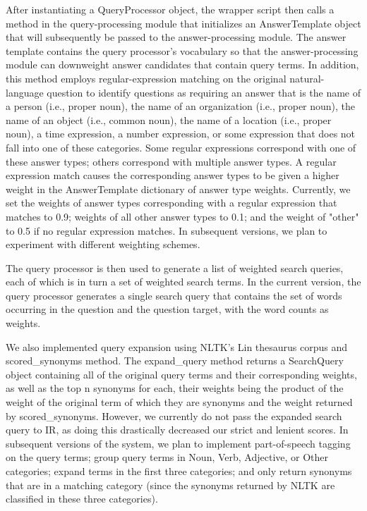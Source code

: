 \documentclass[11pt]{article}
\begin{document}
After instantiating a QueryProcessor object, the wrapper script then calls a method in the query-processing module that initializes an AnswerTemplate object that will subsequently be passed to the answer-processing module. The answer template contains the query processor's vocabulary so that the answer-processing module can downweight answer candidates that contain query terms. In addition, this method employs regular-expression matching on the original natural-language question to identify questions as requiring an answer that is the name of a person (i.e., proper noun), the name of an organization (i.e., proper noun), the name of an object (i.e., common noun), the name of a location (i.e., proper noun), a time expression, a number expression, or some expression that does not fall into one of these categories. Some regular expressions correspond with one of these answer types; others correspond with multiple answer types. A regular expression match causes the corresponding answer types to be given a higher weight in the AnswerTemplate dictionary of answer type weights. Currently, we set the weights of answer types corresponding with a regular expression that matches to 0.9; weights of all other answer types to 0.1; and the weight of "other" to 0.5 if no regular expression matches. In subsequent versions, we plan to experiment with different weighting schemes.

The query processor is then used to generate a list of weighted search queries, each of which is in turn a set of weighted search terms. In the current version, the query processor generates a single search query that contains the set of words occurring in the question and the question target, with the word counts as weights.

We also implemented query expansion using NLTK's Lin thesaurus corpus and scored\_synonyms method. The expand\_query method returns a SearchQuery object containing all of the original query terms and their corresponding weights, as well as the top n synonyms for each, their weights being the product of the weight of the original term of which they are synonyms and the weight returned by scored\_synonyms. However, we currently do not pass the expanded search query to IR, as doing this drastically decreased our strict and lenient scores. In subsequent versions of the system, we plan to implement part-of-speech tagging on the query terms; group query terms in Noun, Verb, Adjective, or Other categories; expand terms in the first three categories; and only return synonyms that are in a matching category (since the synonyms returned by NLTK are classified in these three categories).
\end{document}
